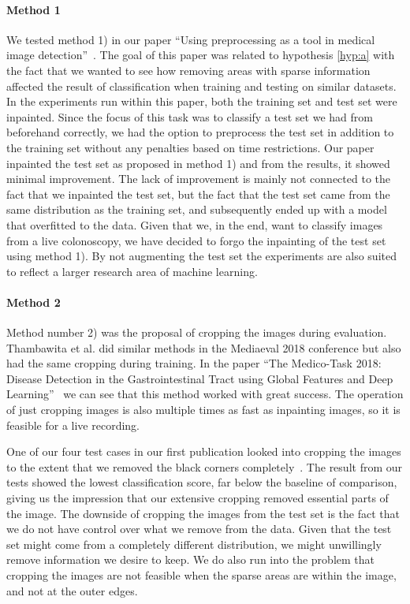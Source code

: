 \paragraph{Method 1}
We tested method 1) in our paper ``Using preprocessing as a tool in medical image detection''~\cite{26254}.
The goal of this paper was related to hypothesis \ref{hyp:a} with the fact that we wanted to see how removing areas with sparse information affected the result of classification when training and testing on similar datasets. 
In the experiments run within this paper, both the training set and test set were inpainted. 
Since the focus of this task was to classify a test set we had from beforehand correctly, we had the option to preprocess the test set in addition to the training set without any penalties based on time restrictions. 
Our paper inpainted the test set as proposed in method 1) and from the results, it showed minimal improvement. The lack of improvement is mainly not connected to the fact that we inpainted the test set, but the fact that the test set came from the same distribution as the training set, and subsequently ended up with a model that overfitted to the data.
Given that we, in the end, want to classify images from a live colonoscopy, we have decided to forgo the inpainting of the test set using method 1).
By not augmenting the test set the experiments are also suited to reflect a larger research area of machine learning.



\paragraph{Method 2}
Method number 2) was the proposal of cropping the images during evaluation.  Thambawita et al. did similar methods in the Mediaeval 2018 conference but also had the same cropping during training. In the paper ``The Medico-Task 2018: Disease Detection in the Gastrointestinal Tract using Global Features and Deep Learning''~\cite{26205} we can see that this method worked with great success. 
The operation of just cropping images is also multiple times as fast as inpainting images, so it is feasible for a live recording. 

One of our four test cases in our first publication looked into cropping the images to the extent that we removed the black corners completely~\cite{26254}. The result from our tests showed the lowest classification score, far below the baseline of comparison, giving us the impression that our extensive cropping removed essential parts of the image. 
The downside of cropping the images from the test set is the fact that we do not have control over what we remove from the data. Given that the test set might come from a completely different distribution, we might unwillingly remove information we desire to keep. We do also run into the problem that cropping the images are not feasible when the sparse areas are within the image, and not at the outer edges.

